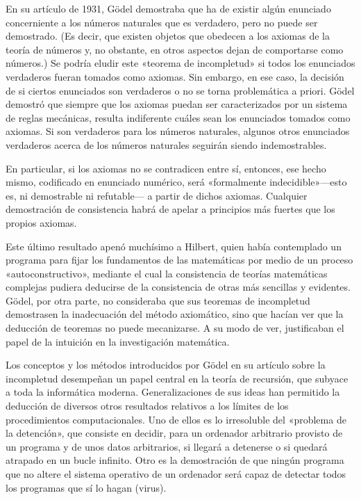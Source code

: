 \documentclass[a4paper, 12pt]{article}
\begin{document}
En su artículo de 1931, Gödel demostraba que ha de existir algún enunciado concerniente a los números naturales que es verdadero, pero no puede ser demostrado. (Es decir, que existen objetos que obedecen a los axiomas de la teoría de números y, no obstante, en otros aspectos dejan de comportarse como números.) Se podría eludir este «teorema de incompletud» si todos los enunciados verdaderos fueran tomados como axiomas. Sin embargo, en ese caso, la decisión de si ciertos enunciados son verdaderos o no se torna problemática a priori. Gödel demostró que siempre que los axiomas puedan ser caracterizados por un sistema de reglas mecánicas, resulta indiferente cuáles sean los enunciados tomados como axiomas. Si son verdaderos para los números naturales, algunos otros enunciados verdaderos acerca de los números naturales seguirán siendo indemostrables.

En particular, si los axiomas no se contradicen entre sí, entonces, ese hecho mismo, codificado en enunciado numérico, será «formalmente indecidible»\linebreak ---esto es, ni demostrable ni refutable--- a partir de dichos axiomas. Cualquier demostración de consistencia habrá de apelar a principios más fuertes que los propios axiomas.

Este último resultado apenó muchísimo a Hilbert, quien había contemplado un programa para fijar los fundamentos de las matemáticas por medio de un proceso «autoconstructivo», mediante el cual la consistencia de teorías matemáticas complejas pudiera deducirse de la consistencia de otras más sencillas y evidentes. Gödel, por otra parte, no consideraba que sus teoremas de incompletud demostrasen la inadecuación del método axiomático, sino que hacían ver que la deducción de teoremas no puede mecanizarse. A su modo de ver, justificaban el papel de la intuición en la investigación matemática.

Los conceptos y los métodos introducidos por Gödel en su artículo sobre la incompletud desempeñan un papel central en la teoría de recursión, que subyace a toda la informática moderna. Generalizaciones de sus ideas han permitido la deducción de diversos otros resultados relativos a los límites de los procedimientos computacionales. Uno de ellos es lo irresoluble del «problema de la detención», que consiste en decidir, para un ordenador arbitrario provisto de un programa y de unos datos arbitrarios, si llegará a detenerse o si quedará atrapado en un bucle infinito. Otro es la demostración de que ningún programa que no altere el sistema operativo de un ordenador será capaz de detectar todos los programas que sí lo hagan (virus).
\end{document}
